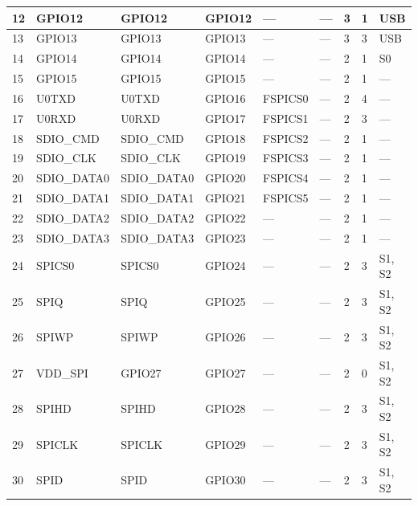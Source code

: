 \begin{longtable}[c]{|p{0.7cm}|p{1.9cm}|p{1.9cm}|p{1.9cm}|p{1.9cm}|p{1.9cm}|p{1cm}|p{1cm}|p{1.2cm}| }
12 & GPIO12          & GPIO12        & GPIO12  & ---          & ---            & 3           & 1 & USB \\ \hline
13 & GPIO13          & GPIO13        & GPIO13  & ---          & ---            & 3           & 3 & USB \\ \hline
14 & GPIO14          & GPIO14        & GPIO14  & ---          & ---            & 2           & 1 & S0 \\ \hline
15 & GPIO15          & GPIO15        & GPIO15  & ---          & ---            & 2           & 1 & --- \\ \hline
16 & U0TXD           & U0TXD         & GPIO16  & FSPICS0    & ---            & 2           & 4 & --- \\ \hline
17 & U0RXD           & U0RXD         & GPIO17  & FSPICS1    & ---            & 2           & 3 & --- \\ \hline
18 & SDIO\_CMD       & SDIO\_CMD     & GPIO18  & FSPICS2    & ---            & 2           & 1 & --- \\ \hline
19 & SDIO\_CLK       & SDIO\_CLK     & GPIO19  & FSPICS3    & ---            & 2           & 1 & --- \\ \hline
20 & SDIO\_DATA0     & SDIO\_DATA0   & GPIO20  & FSPICS4    & ---            & 2           & 1 & --- \\ \hline
21 & SDIO\_DATA1     & SDIO\_DATA1   & GPIO21  & FSPICS5    & ---            & 2           & 1 & --- \\ \hline
22 & SDIO\_DATA2     & SDIO\_DATA2   & GPIO22  & ---          & ---            & 2           & 1 & --- \\ \hline
23 & SDIO\_DATA3     & SDIO\_DATA3   & GPIO23  & ---          & ---            & 2           & 1 & --- \\ \hline
24 & SPICS0          & SPICS0        & GPIO24  & ---          & ---            & 2           & 3 & S1, S2 \\ \hline
25 & SPIQ            & SPIQ          & GPIO25  & ---          & ---            & 2           & 3 & S1, S2 \\ \hline
26 & SPIWP           & SPIWP         & GPIO26  & ---          & ---            & 2           & 3 & S1, S2 \\ \hline
27 & VDD\_SPI        & GPIO27        & GPIO27  & ---          & ---            & 2           & 0 & S1, S2 \\ \hline
28 & SPIHD           & SPIHD         & GPIO28  & ---          & ---            & 2           & 3 & S1, S2 \\ \hline
29 & SPICLK          & SPICLK        & GPIO29  & ---          & ---            & 2           & 3 & S1, S2 \\ \hline
30 & SPID            & SPID          & GPIO30  & ---          & ---            & 2           & 3 & S1, S2 \\ \hline

    \end{longtable}
\normalsize

